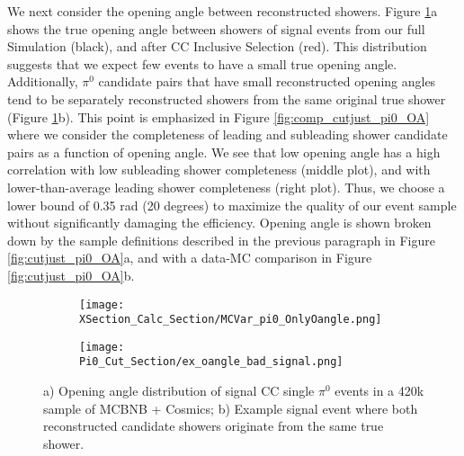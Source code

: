 \par We next consider the opening angle between reconstructed showers. Figure \ref{fig:mcvar_pi0_onlyoangle}a shows the true opening angle between showers of signal events from our full Simulation (black), and after CC Inclusive Selection (red). This distribution suggests that we expect few events to have a small true opening angle. Additionally, $\pi^0$ candidate pairs that have small reconstructed opening angles tend to be separately reconstructed showers from the same original true shower (Figure \ref{fig:mcvar_pi0_onlyoangle}b). This point is emphasized in Figure \ref{fig:comp_cutjust_pi0_OA} where we consider the completeness of leading and subleading shower candidate pairs as a function of opening angle. We see that low opening angle has a high correlation with low subleading shower completeness (middle plot), and with lower-than-average leading shower completeness (right plot). Thus, we choose a lower bound of 0.35 rad (20 degrees) to maximize the quality of our event sample without significantly damaging the efficiency. Opening angle is shown broken down by the sample definitions described in the previous paragraph in Figure \ref{fig:cutjust_pi0_OA}a, and with a data-MC comparison in Figure \ref{fig:cutjust_pi0_OA}b. %


\begin{figure}[H]
\centering
  \begin{subfigure}[t]{0.35\textwidth}
    \centering
     \texttt{[image: XSection\_Calc\_Section/MCVar\_pi0\_OnlyOangle.png]}
     \caption{ }
  \end{subfigure} 
  \begin{subfigure}[t]{0.6\textwidth}
    \centering
    \texttt{[image: Pi0\_Cut\_Section/ex\_oangle\_bad\_signal.png]}
    \caption{ }
  \end{subfigure} 
  \caption{ a) Opening angle distribution of signal CC single $\pi^0$ events in a 420k sample of MCBNB + Cosmics; b) Example signal event where both reconstructed candidate showers originate from the same true shower. }
\label{fig:mcvar_pi0_onlyoangle}
\end{figure}

